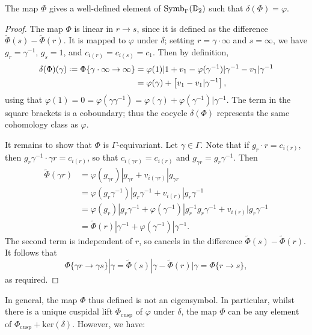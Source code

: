 \documentclass[a4paper,11pt]{article}
\numberwithin{equation}{section}
\begin{document}
	
	\begin{proposition}
		The map $\Phi$ gives a well-defined element of $\mathrm{Symb}_{\Gamma}(\mathbb{D}_2)$ such that $\delta(\Phi) = \varphi$.
	\end{proposition}
	\begin{proof}
		The map $\Phi$ is linear in $r \to s$, since it is defined as the difference $\widetilde{\Phi}(s) - \widetilde{\Phi}(r)$. It is mapped to $\varphi$ under $\delta$; setting $r = \gamma\cdot\infty$ and $s = \infty$, we have $g_r = \gamma^{-1}$, $g_s = 1$, and $c_{i(r)} = c_{i(s)} = c_1$. Then by definition,
		\begin{align*}
			\delta(\Phi)(\gamma) \defeq \Phi\{\gamma\cdot\infty \to \infty\} &= \varphi(1)|1 + v_1 - \varphi(\gamma^{-1})|\gamma^{-1} - v_1|\gamma^{-1}\\
									&= \varphi(\gamma) + \left[v_1 - v_1|\gamma^{-1}\right],
		\end{align*}
		using that $\varphi(1) = 0 = \varphi(\gamma\gamma^{-1}) = \varphi(\gamma) + \varphi(\gamma^{-1})|\gamma^{-1}$. The term in the square brackets is a coboundary; thus the cocycle $\delta(\Phi)$ represents the same cohomology class as $\varphi$.
		
		It remains to show that $\Phi$ is $\Gamma$-equivariant. Let $\gamma \in \Gamma$. Note that if $g_r \cdot r = c_{i(r)}$, then $g_r\gamma^{-1} \cdot \gamma r = c_{i(r)}$, so that $c_{i(\gamma r)} = c_{i(r)}$ and $g_{\gamma r} = g_r\gamma^{-1}$. Then
		\begin{align*}
			\widetilde{\Phi}(\gamma r) &= \varphi(g_{\gamma r})|g_{\gamma r} + v_{i(\gamma r)}|g_{\gamma r}\\
					 &= \varphi(g_r \gamma^{-1})|g_r\gamma^{-1} + v_{i(r)}|g_r\gamma^{-1}\\
						&= \varphi(g_r)|g_r\gamma^{-1} + \varphi(\gamma^{-1})|g_r^{-1}g_r\gamma^{-1} + v_{i(r)}|g_r\gamma^{-1}\\
						&= \widetilde{\Phi}(r)|\gamma^{-1} + \varphi(\gamma^{-1})|\gamma^{-1}.
		\end{align*}
		The second term is independent of $r$, so cancels in the difference $\widetilde{\Phi}(s) - \widetilde{\Phi}(r)$. It follows that
		\[
			\Phi\{\gamma r \to \gamma s\}|\gamma = \widetilde{\Phi}(s)|\gamma - \widetilde{\Phi}(r)|\gamma = \Phi\{r\to s\},
		\]
		as required.
	\end{proof}

In general, the map $\Phi$ thus defined is not an eigensymbol. In particular, whilst there is a unique cuspidal lift $\Phi_{\mathrm{cusp}}$ of $\varphi$ under $\delta$, the map $\Phi$ can be any element of $\Phi_{\mathrm{cusp}} + \mathrm{ker}(\delta)$. However, we have:
\end{document}
